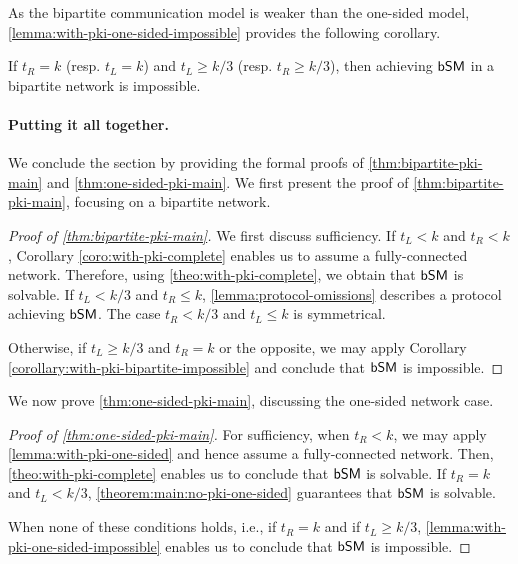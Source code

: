 As the bipartite communication model is weaker than the one-sided model, \cref{lemma:with-pki-one-sided-impossible} provides the following corollary.
\begin{corollary}\label{corollary:with-pki-bipartite-impossible}
If $t_R = k$ (resp. $t_L = k$) and $t_L \geq k/3$ (resp. $t_R \geq k/3$), then achieving $\textsf{bSM}$ in a bipartite network is impossible.
\end{corollary}




\paragraph{Putting it all together.} We conclude the section by providing the formal proofs of \cref{thm:bipartite-pki-main} and \cref{thm:one-sided-pki-main}. 
We first present the proof of \cref{thm:bipartite-pki-main}, focusing on a bipartite network.



\begin{proof}[Proof of \cref{thm:bipartite-pki-main}]
We first discuss sufficiency.
If $t_L < k$ and $t_R < k$, Corollary \ref{coro:with-pki-complete} enables us to assume a fully-connected network. Therefore, using \cref{theo:with-pki-complete}, we obtain that $\textsf{bSM}$ is solvable. If $t_L < k / 3$ and $t_R \leq k$, \cref{lemma:protocol-omissions} describes a protocol achieving $\textsf{bSM}$. The case $t_R < k / 3$ and $t_L \leq k$ is symmetrical.


Otherwise, if $t_L \geq k/3$ and $t_R = k$ or the opposite, we may apply Corollary \ref{corollary:with-pki-bipartite-impossible} and conclude that $\textsf{bSM}$ is impossible. 
\end{proof}


We now prove \cref{thm:one-sided-pki-main}, discussing the one-sided network case.
\begin{proof}[Proof of \cref{thm:one-sided-pki-main}]
For sufficiency, when $t_R < k$, we may apply \cref{lemma:with-pki-one-sided} and hence assume a fully-connected network. Then, \cref{theo:with-pki-complete} enables us to conclude that $\textsf{bSM}$ is solvable. If $t_R = k$ and $t_L < k/3$, \cref{theorem:main:no-pki-one-sided} guarantees that $\textsf{bSM}$ is solvable.
    
When none of these conditions holds, i.e., if $t_R = k$ and if $t_L \geq k/3$, \cref{lemma:with-pki-one-sided-impossible} enables us to conclude that $\textsf{bSM}$ is impossible.
\end{proof}
